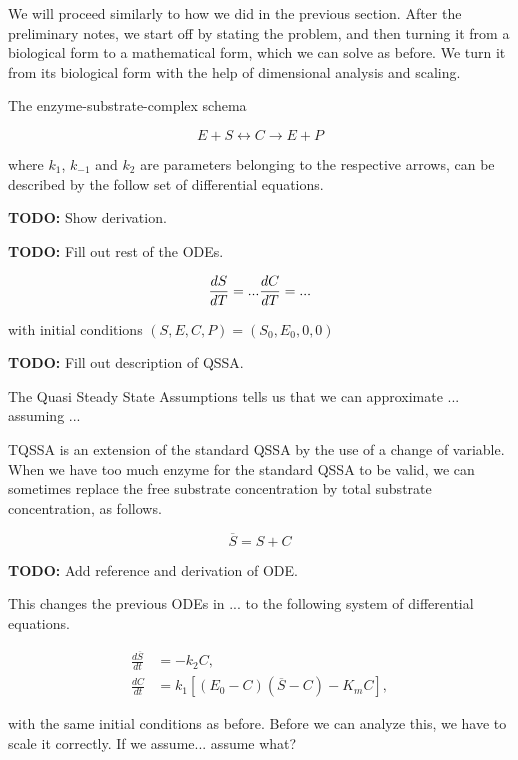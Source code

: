 \documentclass[12pt]{report}
\begin{document}
We will proceed similarly to how we did in the previous section. After
the preliminary notes, we start off by stating the problem, and then
turning it from a biological form to a mathematical form, which we can
solve as before. We turn it from its biological form with the help of
dimensional analysis and scaling.

The enzyme-substrate-complex schema

\begin{equation}
E + S \leftrightarrow C \rightarrow E + P
\end{equation}

where $k_1$, $k_{-1}$ and $k_2$ are parameters belonging to the
respective arrows, can be described by the follow set of differential
equations.

\textbf{TODO:} Show derivation.

\textbf{TODO:} Fill out rest of the ODEs.

\begin{equation}
\frac{dS}{dT} = ... \\
\frac{dC}{dT} = ...
\end{equation}

with initial conditions $(S,E,C,P) = (S_0, E_0, 0, 0)$

\textbf{TODO:} Fill out description of QSSA.

The Quasi Steady State Assumptions tells us that we can approximate
... assuming ...

TQSSA is an extension of the standard QSSA by the use of a change of
variable. When we have too much enzyme for the standard QSSA to be
valid, we can sometimes replace the free substrate concentration by
total substrate concentration, as follows.

\begin{equation}
\overline{S} = S+C
\end{equation}

\textbf{TODO:} Add reference and derivation of ODE.

This changes the previous ODEs in ... to the following system of
differential equations.

\begin{align*}
\frac{d\overline{S}}{dt} &= -k_2C, \\
\frac{dC}{dt} &= k_1[(E_0 - C)(\overline{S}-C)-K_m C],
\end{align*}

with the same initial conditions as before. Before we can analyze
this, we have to scale it correctly. If we assume... assume what?
\end{document}
